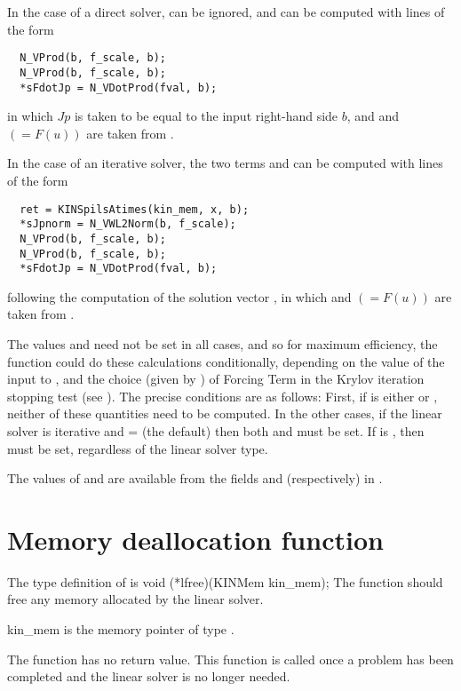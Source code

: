In the case of a direct solver,  can be ignored, and
 can be computed with lines of the form
\vspace{-.1in}
  \begin{verbatim}
  N_VProd(b, f_scale, b);
  N_VProd(b, f_scale, b);
  *sFdotJp = N_VDotProd(fval, b);
  \end{verbatim}
\vspace{-.2in}
in which $Jp$ is taken to be equal to the input right-hand side $b$,
and  and  $(= F(u))$ are taken from .

In the case of an iterative solver, the two terms  and
 can be computed with lines of the form
\vspace{-.1in}
  \begin{verbatim}
  ret = KINSpilsAtimes(kin_mem, x, b);
  *sJpnorm = N_VWL2Norm(b, f_scale);
  N_VProd(b, f_scale, b);
  N_VProd(b, f_scale, b);
  *sFdotJp = N_VDotProd(fval, b);
  \end{verbatim}
\vspace{-.2in}
following the computation of the solution vector , in which
 and  $(= F(u))$ are taken from .

The values  and  need not be set in all cases,
and so for maximum efficiency, the  function could do these
calculations conditionally, depending on the value of the input 
to , and the choice (given by ) of Forcing Term
in the Krylov iteration stopping test (see ).
The precise conditions are as follows:  First, if  is
either  or , neither of these quantities
need to be computed.  In the other cases, if the linear solver is iterative
and  =  (the default) then both
 and  must be set.  If  is
, then  must be set, regardless of
the linear solver type.

The values of  and  are available from the fields
 and  (respectively) in .


\section{Memory deallocation function}
The type definition of  is
{
  void (*lfree)(KINMem kin\_mem);
}
{
  The  function should free any memory allocated by the linear solver.
}
{
  \begin{args}
  \item[kin\_mem]
    is the {\kinsol} memory pointer of type .
  \end{args}
}
{
  The  function has no return value.
}
{
  This function is called once a problem has been completed and the 
  linear solver is no longer needed.
}